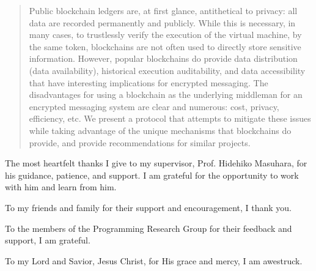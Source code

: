 \documentclass[
11pt, %
english, %
singlespacing, %
headsepline, %
]{MastersDoctoralThesis} %
\begin{document}
\begin{abstract}
Public blockchain ledgers are, at first glance, antithetical to privacy: all data are recorded permanently and publicly. While this is necessary, in many cases, to trustlessly verify the execution of the virtual machine, by the same token, blockchains are not often used to directly store sensitive information. However, popular blockchains do provide data distribution (data availability), historical execution auditability, and data accessibility that have interesting implications for encrypted messaging. The disadvantages for using a blockchain as the underlying middleman for an encrypted messaging system are clear and numerous: cost, privacy, efficiency, etc. We present a protocol that attempts to mitigate these issues while taking advantage of the unique mechanisms that blockchains do provide, and provide recommendations for similar projects.
\end{abstract}


\begin{acknowledgements}
The most heartfelt thanks I give to my supervisor, Prof. Hidehiko Masuhara, for his guidance, patience, and support. I am grateful for the opportunity to work with him and learn from him.

To my friends and family for their support and encouragement, I thank you.

To the members of the Programming Research Group for their feedback and support, I am grateful.

To my Lord and Savior, Jesus Christ, for His grace and mercy, I am awestruck.
\end{acknowledgements}


\tableofcontents %

\listoffigures %

\end{document}
